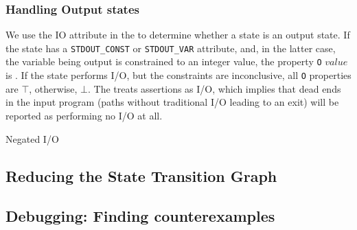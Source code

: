 \subsubsection{Handling Output states}
We use the IO attribute in the \STG to determine whether a state is an
output state. If the state has a \verb|STDOUT_CONST| or
\verb|STDOUT_VAR| attribute, and, in the latter case, the variable
being output is constrained to an integer value, the property \verb|O|
$\mathit{value}$ is \ttrue. If the state performs I/O, but the
constraints are inconclusive, all \verb|O| properties are $\top$,
otherwise, $\bot$. The \STG treats assertions as I/O, which implies
that dead ends in the input program (paths without traditional I/O
leading to an exit) will be reported as performing no I/O at all.

Negated I/O
\subsection{Reducing the State Transition Graph}

\subsection{Debugging: Finding counterexamples}